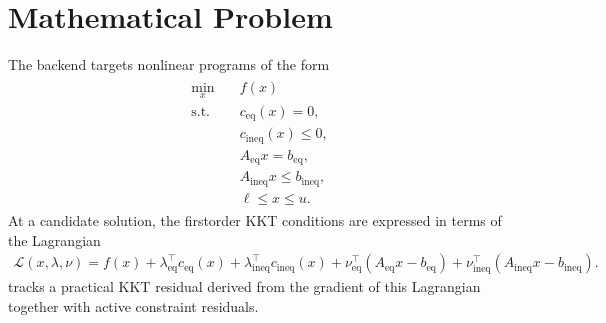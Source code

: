 \documentclass[letterpaper,10pt,english]{sphinxmanual}
\begin{document}
\section{Mathematical Problem}
\label{\detokenize{optima_sequential_qp:mathematical-problem}}
\sphinxAtStartPar
The backend targets nonlinear programs of the form
\begin{equation*}
\begin{split}\begin{aligned}
\min_x \quad & f(x) \\
\text{s.t.} \quad & c_{\mathrm{eq}}(x) = 0, \\
& c_{\mathrm{ineq}}(x) \le 0, \\
& A_{\mathrm{eq}} x = b_{\mathrm{eq}}, \\
& A_{\mathrm{ineq}} x \le b_{\mathrm{ineq}}, \\
& \ell \le x \le u.
\end{aligned}\end{split}
\end{equation*}
\sphinxAtStartPar
At a candidate solution, the first\sphinxhyphen{}order KKT conditions are expressed in terms of the Lagrangian
\begin{equation*}
\begin{split}\mathcal{L}(x,\lambda,\nu)=
f(x)
 + \lambda_{\mathrm{eq}}^\top c_{\mathrm{eq}}(x)
 + \lambda_{\mathrm{ineq}}^\top c_{\mathrm{ineq}}(x)
 + \nu_{\mathrm{eq}}^\top (A_{\mathrm{eq}}x-b_{\mathrm{eq}})
 + \nu_{\mathrm{ineq}}^\top (A_{\mathrm{ineq}}x-b_{\mathrm{ineq}}).\end{split}
\end{equation*}
\sphinxAtStartPar
{} tracks a practical KKT residual derived from the gradient of this Lagrangian together with active constraint residuals.
\end{document}
